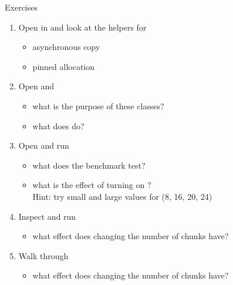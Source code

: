 \begin{frame}[fragile]{Exercises}
    \begin{enumerate}
        \item Open  in  and look at the helpers for
        \begin{itemize}
            \item asynchronous copy 
            \item pinned allocation 
        \end{itemize}

        \item Open  and 
        \begin{itemize}
            \item what is the purpose of these classes?
            \item what does  do?
        \end{itemize}

        \item Open  and run
        \begin{itemize}
            \item what does the benchmark test?
            \item what is the effect of turning on ?\\Hint: try small and large values for  (8, 16, 20, 24)
        \end{itemize}

        \item Inspect  and run
        \begin{itemize}
            \item what effect does changing the number of chunks have?
        \end{itemize}

        \item Walk through 
        \begin{itemize}
            \item what effect does changing the number of chunks have?
        \end{itemize}
    \end{enumerate}
\end{frame}

